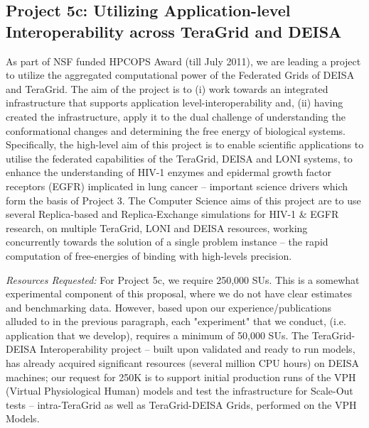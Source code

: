 \documentclass[a4paper,10pt]{article}
\newcommand{\up}{\vspace*{-1em}}
\begin{document}


\subsection*{Project 5c: Utilizing Application-level Interoperability across TeraGrid and DEISA}
\up

As part of NSF funded HPCOPS Award (till July 2011), we are leading a project to utilize the aggregated computational power of the Federated Grids of DEISA and TeraGrid. The aim of the project is to (i) work towards an integrated infrastructure that supports application level-interoperability and, (ii) having created the infrastructure, apply it to the dual challenge of understanding the conformational changes and determining the free energy of biological systems. Specifically, the high-level aim of this project is to enable scientific applications to utilise the federated capabilities of the TeraGrid, DEISA and LONI systems, to enhance the understanding of HIV-1 enzymes and epidermal growth factor receptors (EGFR) implicated in lung cancer -- important science drivers which form the basis of Project 3. The Computer Science aims of this project are to use several Replica-based and Replica-Exchange simulations for HIV-1 \& EGFR research, on multiple TeraGrid, LONI and DEISA resources, working concurrently towards the solution of a single problem instance -- the rapid computation of free-energies of binding with high-levels precision.

{\it Resources Requested:} For Project 5c, we require 250,000 SUs. This is a somewhat experimental component of this proposal, where we do not have clear estimates and benchmarking data. However, based upon our experience/publications alluded to in the previous paragraph, each "experiment" that we conduct, (i.e. application that we develop), requires a minimum of 50,000 SUs. The TeraGrid-DEISA Interoperability project -- built upon validated and ready to run models, has already acquired significant resources (several million CPU hours) on DEISA machines; our request for 250K is to support initial production runs of the VPH (Virtual Physiological Human) models and test the infrastructure for Scale-Out tests -- intra-TeraGrid as well as TeraGrid-DEISA Grids, performed on the VPH Models.
 
\end{document}
